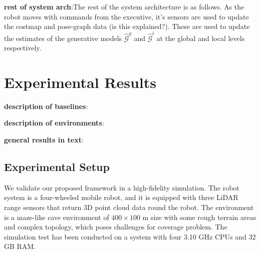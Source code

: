 \documentclass{article}
\newcommand{\ph}[1]{{\textbf{#1}:}} %
\newcommand{\gautam}[1]{{\color{cyan}Gautam: #1 }}
\begin{document}
\ph{rest of system arch}The rest of the system architecture is as follows. As the robot moves with commands from the executive, it's sensors are used to update the costmap and pose-graph data (is this explained?). These are used to update the estimates of the generative models $\hat{\mathcal{G}}^g$ and $\hat{\mathcal{G}}^l$ at the global and local levels respectively. 



\section{Experimental Results}\label{sec:exp_results}


\ph{description of baselines}

\ph{description of environments}

\ph{general results in text}

    
\subsection{Experimental Setup}





We validate our proposed framework in a high-fidelity simulation.
The robot system is a four-wheeled mobile robot, and it is equipped with three LiDAR range sensors that return 3D point cloud data round the robot.
The environment is a maze-like cave environment of $400 \times 100$ m size with some rough terrain areas and complex topology, which poses challenges for coverage problem.
The simulation test has been conducted on a system with four 3.10 GHz CPUs and 32 GB RAM.
\end{document}
